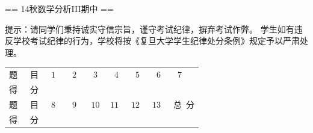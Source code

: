 == 14秋数学分析III期中 ==

\begin{center}

\end{center}

\qquad 提示：请同学们秉持诚实守信宗旨，谨守考试纪律，摒弃考试作弊。
学生如有违反学校考试纪律的行为，学校将按《复旦大学学生纪律处分条例》规定予以严肃处理。

\begin{table}\begin{tabular}{|c|c|c|c|}
题\ \ \ 目 &\quad\ $1$\quad\ &\quad\ $2$\quad\ &\quad\ $3$\quad\ &\quad\ $4$\quad\ &\quad\ $5$\quad\ &\quad\ $6$\quad\ &\quad\ $7$\quad\ \\
得\ \ \ 分 & & & & & & & \\
题\ \ \ 目 &$8$&$9$&$10$&$11$&$12$&$13$&总\ 分\\
得\ \ \ 分 & & & & & & & 
\end{tabular}\end{table}

